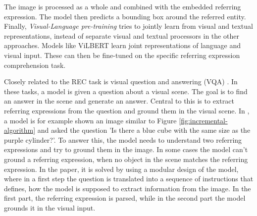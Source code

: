 The image is processed as a whole and combined with the embedded referring expression.
The model then predicts a bounding box around the referred entity.
Finally, \emph{Visual-Language pre-training} tries to jointly learn from visual and textual representations, instead of separate visual and textual processors in the other approaches.
Models like ViLBERT \citep{Lu2019} learn joint representations of language and visual input.
These can then be fine-tuned on the specific referring expression comprehension task.

Closely related to the REC task is visual question and answering (VQA) \citep{Ahrens2022,Antol2015,Ilinykh2022,Xu2016}.
In these tasks, a model is given a question about a visual scene.
The goal is to find an answer in the scene and generate an answer.
Central to this is to extract referring expressions from the question and ground them in the visual scene.
In \citep{Johnson2017}, a model is for example shown an image similar to Figure \ref{fig:incremental-algorithm} and asked the question 'Is there a blue cube with the same size as the purple cylinder?'.
To answer this, the model needs to understand two referring expressions and try to ground them in the image.
In some cases the model can't ground a referring expression, when no object in the scene matches the referring expression.
In the paper, it is solved by using a modular design of the model, where in a first step the question is translated into a sequence of instructions that defines, how the model is supposed to extract information from the image.
In the first part, the referring expression is parsed, while in the second part the model grounds it in the visual input.


